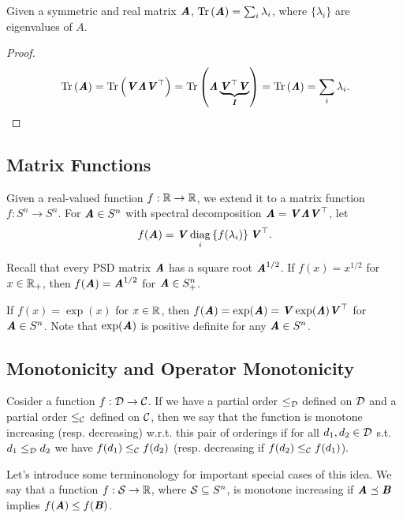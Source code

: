 \begin{claim}\label{clm:tr_eq_sum_eigen}
  Given a symmetric and real matrix $\AA$, $\trace{\AA} = \sum_{i}\lambda_i$, where $\{\lambda_i\}$ are eigenvalues of $A$.
\end{claim}
\begin{proof}
  \[ \trace{\AA} = \trace{\VV\LLambda\VV^\trp} = \trace{\LLambda\underbrace{\VV^\trp\VV}_{\II}} = \trace{\LLambda} = \sum_i \lambda_i. \]
\end{proof}

\subsection{Matrix Functions}
\begin{definition}
  Given a real-valued function $f:\R\to\R$, we extend it to a matrix function $f:S^n\to S^n$.
  For $\AA\in S^n$ with spectral decomposition $\AA=\VV\LLambda\VV^\trp$, let
  \[ f(\AA) = \VV \diag_i\left\{f(\lambda_i)\right\} \VV^\trp. \]
\end{definition}
\begin{example}
  Recall that every PSD matrix $\AA$ has a square root $\AA^{1/2}$.
  If $f(x) = x^{1/2}$ for $x\in\R_+$, then $f(\AA)=\AA^{1/2}$ for $\AA\in S^n_+$.
\end{example}
\begin{example}
  If $f(x) = \exp(x)$ for $x\in\R$, then $f(\AA) = \exp(\AA) = \VV\exp(\LLambda)\VV^\trp$ for $\AA\in S^n$.
  Note that $\exp(\AA)$ is positive definite for any $\AA\in S^n$.
\end{example}

\subsection{Monotonicity and Operator Monotonicity}
 Cosider a function $f:
 \calD \to \calC$.
 If we have a partial order $\leq_{\calD}$ defined on $\calD$ and a
 partial order $\leq_{\calC}$ defined on $\calC$, then we say that
 the function is monotone increasing (resp. decreasing) w.r.t. this pair of orderings if for all $d_1, d_2
 \in \calD$ s.t. $d_1 \leq_{\calD} d_2$ we have $f(d_1) \leq_{\calC}
 f(d_2) $ (resp. decreasing if $f(d_2) \leq_{\calC} f(d_1)$).

Let's  introduce some terminonology for important special cases of this idea.
We say that a function $f : \calS \to \R$, where $\calS \subseteq \symsetn$,
  is monotone increasing if $\AA \preceq \BB$ implies $f(\AA) \leq f(\BB)$.

